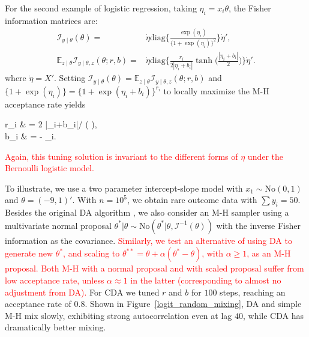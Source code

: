 \documentclass[11pt]{article}
\newcommand{\leo}[1]{{\textcolor{red}{#1}}}
\newcommand{\be}{\begin{equs}}
\newcommand{\ee}{\end{equs}}
\newcommand{\bb}[1]{\mathbb{#1}}
\newcommand{\mc}[1]{\mathcal{#1}}
\newcommand{\No}{\text{No}}
\newcommand{\diag}{\text{diag}}
\begin{document}
 
For the second example of logistic regression, taking $\eta_i=x_i\theta$, the Fisher information matrices
are:
 \begin{eqnarray}
\mc I_{y\mid \theta}({\theta}) =&  \dot\eta \diag\bigg\{\frac{\exp(\eta_i)}{ \{1+\exp(\eta_i)\} ^2}\bigg\} \dot\eta', \nonumber \\
\bb E_{z\mid \theta}\mc I_{y\mid \theta,z}({\theta};r,b)= & \dot\eta  \diag\bigg\{ \frac{r_i}{2 |\eta_i+b_i|}\tanh\Big(\frac{|\eta_i+b_i|}{2} \Big)\bigg\} \dot\eta' .  \nonumber
\end{eqnarray}
where $\dot\eta=X'$. 
Setting $\mc I_{y\mid \theta}({\theta})=\bb E_{z\mid \theta}\mc I_{y\mid \theta,z}({\theta};r,b)$ and $ \{1+\exp(\eta_i)\}  = \{1+\exp(\eta_i+b_i)\}^{r_i}$
to locally maximize the M-H acceptance rate yields
\be
r_i & = {2 |\eta_i+b_i|}/ \tanh\Big( \Big),
\\ b_i & =  - \eta_i.
\ee
\leo{Again, this tuning solution is invariant to the different forms of $\eta$ under
the Bernoulli logistic model.}

To illustrate, we use a two parameter intercept-slope model with $x_1\sim \No(0,1)$ and $\theta=(-9,1)'$. With $n= 10^5$, we obtain rare outcome data with 
$\sum y_{i} = 50 $.  Besides the original DA algorithm  \citep{polson2013bayesian}, we also consider an M-H sampler using a multivariate normal proposal $\theta^*|\theta \sim \No(\theta^*| \theta, {\mc I}^{-1}(\theta))$ with the inverse Fisher information as the covariance. \leo{Similarly, we test an alternative of using DA to generate new $\theta^*$, and scaling to $\theta^{**}=\theta+\alpha(\theta^{*}-\theta)$, with $\alpha\ge 1$, as an M-H proposal. Both M-H with a normal proposal and with scaled proposal suffer from low acceptance rate, unless $\alpha\approx 1$ in the latter (corresponding to almost no adjustment from DA).} For CDA we tuned $r$ and $b$ for $100$ steps, reaching an acceptance rate of $0.8$.  Shown in Figure~\ref{logit_random_mixing}, DA and simple M-H mix slowly, exhibiting strong autocorrelation even at lag $40$, while CDA has dramatically better mixing.
\end{document}
